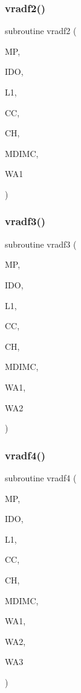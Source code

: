 \subsubsection{\texorpdfstring{vradf2()}{vradf2()}}
{\footnotesize\ttfamily subroutine vradf2 (\begin{DoxyParamCaption}\item[{}]{MP,  }\item[{}]{I\+DO,  }\item[{}]{L1,  }\item[{dimension(mdimc,ido,l1,2)}]{CC,  }\item[{dimension(mdimc,ido,2,l1)}]{CH,  }\item[{}]{M\+D\+I\+MC,  }\item[{dimension(ido)}]{W\+A1 }\end{DoxyParamCaption})}

\mbox{\label{sfft_8f_a65e357e8ef1818d89c8a5fc8f9f680ac}} 
\subsubsection{\texorpdfstring{vradf3()}{vradf3()}}
{\footnotesize\ttfamily subroutine vradf3 (\begin{DoxyParamCaption}\item[{}]{MP,  }\item[{}]{I\+DO,  }\item[{}]{L1,  }\item[{dimension(mdimc,ido,l1,3)}]{CC,  }\item[{dimension(mdimc,ido,3,l1)}]{CH,  }\item[{}]{M\+D\+I\+MC,  }\item[{dimension(ido)}]{W\+A1,  }\item[{dimension(ido)}]{W\+A2 }\end{DoxyParamCaption})}

\mbox{\label{sfft_8f_a806321a80ed418620c4860fc17ce72e0}} 
\subsubsection{\texorpdfstring{vradf4()}{vradf4()}}
{\footnotesize\ttfamily subroutine vradf4 (\begin{DoxyParamCaption}\item[{}]{MP,  }\item[{}]{I\+DO,  }\item[{}]{L1,  }\item[{dimension(mdimc,ido,l1,4)}]{CC,  }\item[{dimension(mdimc,ido,4,l1)}]{CH,  }\item[{}]{M\+D\+I\+MC,  }\item[{dimension(ido)}]{W\+A1,  }\item[{dimension(ido)}]{W\+A2,  }\item[{dimension(ido)}]{W\+A3 }\end{DoxyParamCaption})}

